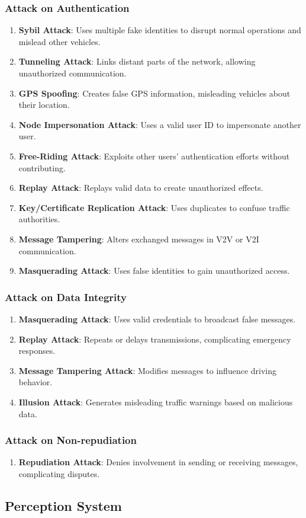 \subsubsection{Attack on Authentication}
\begin{enumerate}
    \item \textbf{Sybil Attack}: Uses multiple fake identities to disrupt normal operations and mislead other vehicles.
    \item \textbf{Tunneling Attack}: Links distant parts of the network, allowing unauthorized communication.
    \item \textbf{GPS Spoofing}: Creates false GPS information, misleading vehicles about their location.
    \item \textbf{Node Impersonation Attack}: Uses a valid user ID to impersonate another user.
    \item \textbf{Free-Riding Attack}: Exploits other users' authentication efforts without contributing.
    \item \textbf{Replay Attack}: Replays valid data to create unauthorized effects.
    \item \textbf{Key/Certificate Replication Attack}: Uses duplicates to confuse traffic authorities.
    \item \textbf{Message Tampering}: Alters exchanged messages in V2V or V2I communication.
    \item \textbf{Masquerading Attack}: Uses false identities to gain unauthorized access.
\end{enumerate}

\subsubsection{Attack on Data Integrity}
\begin{enumerate}
    \item \textbf{Masquerading Attack}: Uses valid credentials to broadcast false messages.
    \item \textbf{Replay Attack}: Repeats or delays transmissions, complicating emergency responses.
    \item \textbf{Message Tampering Attack}: Modifies messages to influence driving behavior.
    \item \textbf{Illusion Attack}: Generates misleading traffic warnings based on malicious data.
\end{enumerate}

\subsubsection{Attack on Non-repudiation}
\begin{enumerate}
    \item \textbf{Repudiation Attack}: Denies involvement in sending or receiving messages, complicating disputes.
\end{enumerate}




\subsection{Perception System}\label{subsec:perception-system}

